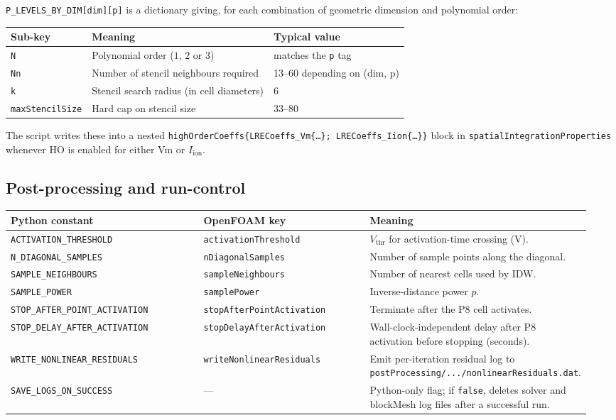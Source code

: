 \documentclass[11pt,a4paper]{article}
\newcommand{\Iion}{I_{\text{ion}}}
\newcommand{\code}[1]{\texttt{\small #1}}
\begin{document}
\code{P\_LEVELS\_BY\_DIM[dim][p]} is a dictionary giving, for each
combination of geometric dimension and polynomial order:
\begin{center}
\begin{tabular}{@{}lll@{}}
\toprule
Sub-key & Meaning & Typical value \\
\midrule
\code{N} & Polynomial order ($1$, $2$ or $3$) & matches the \code{p} tag \\
\code{Nn} & Number of stencil neighbours required & 13--60 depending on (dim, p) \\
\code{k} & Stencil search radius (in cell diameters) & 6 \\
\code{maxStencilSize} & Hard cap on stencil size & 33--80 \\
\bottomrule
\end{tabular}
\end{center}
The script writes these into a nested
\code{highOrderCoeffs\{LRECoeffs\_Vm\{\dots\}; LRECoeffs\_Iion\{\dots\}\}}
block in \code{spatialIntegrationProperties} whenever HO is enabled
for either Vm or $\Iion$.

\subsection{Post-processing and run-control}
\begin{longtable}{@{}p{0.35\linewidth}p{0.30\linewidth}p{0.30\linewidth}@{}}
\toprule
Python constant & OpenFOAM key & Meaning \\
\midrule \endhead
\code{ACTIVATION\_THRESHOLD} & \code{activationThreshold} &
   $V_{\text{thr}}$ for activation-time crossing (V). \\
\code{N\_DIAGONAL\_SAMPLES} & \code{nDiagonalSamples} &
   Number of sample points along the diagonal. \\
\code{SAMPLE\_NEIGHBOURS} & \code{sampleNeighbours} &
   Number of nearest cells used by IDW. \\
\code{SAMPLE\_POWER} & \code{samplePower} &
   Inverse-distance power $p$. \\
\code{STOP\_AFTER\_POINT\_ACTIVATION} &
   \code{stopAfterPointActivation} &
   Terminate after the P8 cell activates. \\
\code{STOP\_DELAY\_AFTER\_ACTIVATION} &
   \code{stopDelayAfterActivation} &
   Wall-clock-independent delay after P8 activation before
   stopping (seconds). \\
\code{WRITE\_NONLINEAR\_RESIDUALS} &
   \code{writeNonlinearResiduals} &
   Emit per-iteration residual log to
   \code{postProcessing/.../nonlinearResiduals.dat}. \\
\code{SAVE\_LOGS\_ON\_SUCCESS} & --- &
   Python-only flag; if \code{false}, deletes solver and
   blockMesh log files after a successful run. \\
\bottomrule
\end{longtable}
\end{document}
